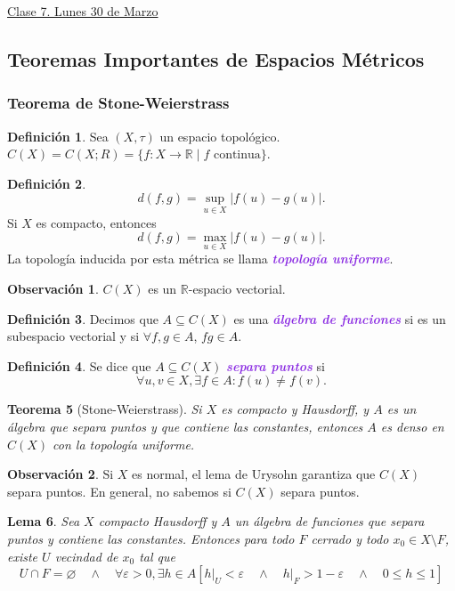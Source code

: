 \documentclass{article}
\newtheorem{theorem}{Teorema}[subsection]
\newtheorem{lemma}[theorem]{Lema}
\theoremstyle{definition}
\newtheorem{definition}[theorem]{Definición}
\newtheorem*{obs}{Observación}
\theoremstyle{remark}
\numberwithin{equation}{section}
\newcommand{\R}{\mathbb{R}}
\newcommand{\e}{\varepsilon}
\newcommand{\abs}[1]{\left| #1 \right|}
\newcommand{\cor}[1]{\left[ #1 \right]}
\newcommand{\wea}[1]{\textcolor{BlueViolet}{\textbf{\emph{#1}}}}
\newcommand{\fecha}[1]{\begin{flushright} \underline{#1} \end{flushright}}
\begin{document}
\newpage
\fecha{Clase 7. Lunes 30 de Marzo}
\subsection{Teoremas Importantes de Espacios Métricos}
\subsubsection{Teorema de Stone-Weierstrass}

\begin{definition}
  Sea $(X,\tau)$ un espacio topológico.
  $C(X) = C(X;R) = \{f \colon X \to \R \mid f \text{ continua}\}$.
\end{definition}

\begin{definition}
  $$d(f,g) = \sup_{u\in X} \abs{f(u) - g(u)}.$$
  Si $X$ es compacto, entonces $$d(f,g) = \max_{u \in X} \abs{f(u) - g(u)}.$$
  La topología inducida por esta métrica se llama \wea{topología uniforme}.
\end{definition}

\begin{obs}
  $C(X)$ es un $\R$-espacio vectorial.
\end{obs}

\begin{definition}
  Decimos que $A \subseteq C(X)$ es una \wea{álgebra de funciones} si es un subespacio vectorial y si $\forall f,g \in A$, $fg \in A$.
\end{definition}

\begin{definition}
  Se dice que $A \subseteq C(X)$ \wea{separa puntos} si $$\forall u,v \in X, \exists f \in A \colon f(u) \neq f(v).$$
\end{definition}

\begin{theorem}[Stone-Weierstrass]
  Si $X$ es compacto y Hausdorff, y $A$ es un álgebra que separa puntos y que contiene las constantes, entonces $A$ es denso en $C(X)$ con la topología uniforme.
\end{theorem}

\begin{obs}
  Si $X$ es normal, el lema de Urysohn garantiza que $C(X)$ separa puntos. En general, no sabemos si $C(X)$ separa puntos.
\end{obs}

\begin{lemma}
  Sea $X$ compacto Hausdorff y $A$ un álgebra de funciones que separa puntos y contiene las constantes.
  Entonces para todo $F$ cerrado y todo $x_0 \in X \setminus F$, existe $U$ vecindad de $x_0$ tal que
  \[U \cap F = \varnothing \quad\land\quad
  \forall \e > 0, \exists h \in A \cor{
    h\vert_U < \e \quad\land\quad
    h\vert_F > 1-\e \quad\land\quad
    0 \leq h \leq 1
  }\]
\end{lemma}
\end{document}
